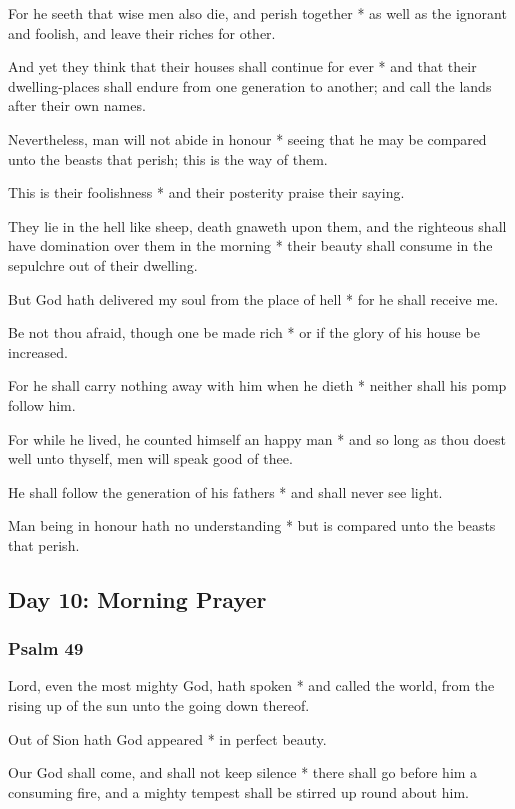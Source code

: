 For he seeth that wise men also die, and perish together * as well as the ignorant and foolish, and leave their riches for other.

And yet they think that their houses shall continue for ever * and that their dwelling-places shall endure from one generation to another; and call the lands after their own names.

Nevertheless, man will not abide in honour * seeing that he may be compared unto the beasts that perish; this is the way of them.

This is their foolishness * and their posterity praise their saying.

They lie in the hell like sheep, death gnaweth upon them, and the righteous shall have domination over them in the morning * their beauty shall consume in the sepulchre out of their dwelling.

But God hath delivered my soul from the place of hell * for he shall receive me.

Be not thou afraid, though one be made rich * or if the glory of his house be increased.

For he shall carry nothing away with him when he dieth * neither shall his pomp follow him.

For while he lived, he counted himself an happy man * and so long as thou doest well unto thyself, men will speak good of thee.

He shall follow the generation of his fathers * and shall never see light.

Man being in honour hath no understanding * but is compared unto the beasts that perish.

\subsection{Day 10: Morning Prayer}

\subsubsection{Psalm 49}


 Lord, even the most mighty God, hath spoken * and called the world, from the rising up of the sun unto the going down thereof.

Out of Sion hath God appeared * in perfect beauty.

Our God shall come, and shall not keep silence * there shall go before him a consuming fire, and a mighty tempest shall be stirred up round about him.

